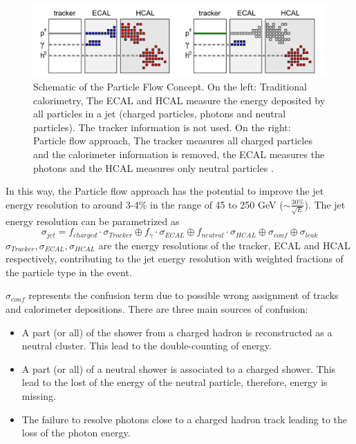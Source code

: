 \begin{figure}[htbp!]
  \centering
  \includegraphics[width=1\linewidth]{chap2/fig/PFAConcept.png}
  \caption{Schematic of the Particle Flow Concept. On the left: Traditional calorimetry, The ECAL and HCAL measure the energy deposited by all particles in a jet (charged particles, photons and neutral particles). The tracker information is not used. On the right: Particle flow approach, The tracker measures all charged particles and the calorimeter information is removed, the ECAL measures the photons and the HCAL measures only neutral particles \cite{Feege:2011dsa}.} \label{fig:PFAConcept}
\end{figure}

In this way, the Particle flow approach has the potential to improve the jet energy resolution to around 3-4\% in the range of 45 to 250 GeV ($\sim \frac{30\%}{\sqrt{E}}$). The jet energy resolution can be parametrized as
\begin{equation}
  \sigma_{jet} = f_{charged} \cdot \sigma_{Tracker} \oplus f_{\gamma} \cdot \sigma_{ECAL} \oplus f_{neutral} \cdot \sigma_{HCAL} \oplus \sigma_{conf} \oplus \sigma_{leak}
\end{equation}
$\sigma_{Tracker}, \sigma_{ECAL}, \sigma_{HCAL}$ are the energy resolutions of the tracker, ECAL and HCAL respectively, contributing to the jet energy resolution with weighted fractions of the particle type in the event.

$\sigma_{conf}$ represents the confusion term due to possible wrong assignment of tracks and calorimeter depositions. There are three main sources of confusion:

\begin{itemize}
  \item A part (or all) of the shower from a charged hadron is reconstructed as a neutral cluster. This lead to the double-counting of energy.
  \item A part (or all) of a neutral shower is associated to a charged shower. This lead to the lost of the energy of the neutral particle, therefore, energy is missing.
  \item The failure to resolve photons close to a charged hadron track leading to the loss of the photon energy.
\end{itemize}

